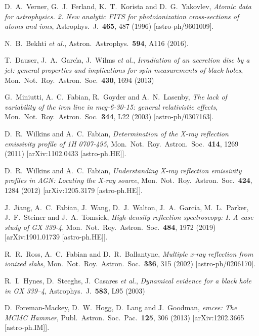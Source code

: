 \documentclass[11pt,a4paper,pdftex]{article}
\begin{document}
\begin{thebibliography}{99}
  D.~A.~Verner, G.~J.~Ferland, K.~T.~Korista and D.~G.~Yakovlev,
  {\it Atomic data for astrophysics. 2. New analytic FITS for photoionization cross-sections of atoms and ions},
  Astrophys.\ J.\  {\bf 465}, 487 (1996)
  [astro-ph/9601009].    
  
  N.~B.~Bekhti {\it et al.},
  Astron.\ Astrophys.\  {\bf 594}, A116 (2016).  
  
  T.~Dauser, J.~A.~Garc{\'\i}a, J.~Wilms {\it et al.},
  {\it Irradiation of an accretion disc by a jet: general properties and implications for spin measurements of black holes},
Mon.\ Not.\ Roy.\ Astron.\ Soc.\  {\bf 430}, 1694 (2013)

  G.~Miniutti, A.~C.~Fabian, R.~Goyder and A.~N.~Lasenby,
  {\it The lack of variability of the iron line in mcg-6-30-15: general relativistic effects},
  Mon.\ Not.\ Roy.\ Astron.\ Soc.\  {\bf 344}, L22 (2003)
  [astro-ph/0307163].

  D.~R.~Wilkins and A.~C.~Fabian,
  {\it Determination of the X-ray reflection emissivity profile of 1H 0707-495},
  Mon.\ Not.\ Roy.\ Astron.\ Soc.\  {\bf 414}, 1269 (2011)
  [arXiv:1102.0433 [astro-ph.HE]].

  D.~R.~Wilkins and A.~C.~Fabian,
  {\it Understanding X-ray reflection emissivity profiles in AGN: Locating the X-ray source},
  Mon.\ Not.\ Roy.\ Astron.\ Soc.\  {\bf 424}, 1284 (2012)
  [arXiv:1205.3179 [astro-ph.HE]].
  
  J.~Jiang, A.~C.~Fabian, J.~Wang, D.~J.~Walton, J.~A.~García, M.~L.~Parker, J.~F.~Steiner and J.~A.~Tomsick,
  {\it High-density reflection spectroscopy: I. A case study of GX 339-4},
  Mon.\ Not.\ Roy.\ Astron.\ Soc.\  {\bf 484}, 1972 (2019)
  [arXiv:1901.01739 [astro-ph.HE]].  
  
  R.~R.~Ross, A.~C.~Fabian and D.~R.~Ballantyne,
  {\it Multiple x-ray reflection from ionized slabs},
  Mon.\ Not.\ Roy.\ Astron.\ Soc.\  {\bf 336}, 315 (2002)
  [astro-ph/0206170].  
  
  R.~I.~Hynes, D.~Steeghs,  J.~Casares {\it et al.},
  {\it Dynamical evidence for a black hole in GX 339--4},
   Astrophys.\ J.\  {\bf 583}, L95 (2003)

  D.~Foreman-Mackey, D.~W.~Hogg, D.~Lang and J.~Goodman,
  {\it emcee: The MCMC Hammer},
  Publ.\ Astron.\ Soc.\ Pac.\  {\bf 125}, 306 (2013)
  [arXiv:1202.3665 [astro-ph.IM]].  
  

\end{thebibliography}
\end{document}

